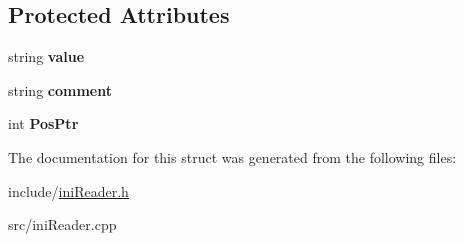 \subsection*{\-Protected \-Attributes}
\begin{DoxyCompactItemize}
\item 
\hypertarget{structKeyRecord_a81186e6db91374fc07fffb11b696ae7f}{string {\bfseries value}}\label{dc/dfa/structKeyRecord_a81186e6db91374fc07fffb11b696ae7f}

\item 
\hypertarget{structKeyRecord_aaa62600eaa986e1bb53f98e4aeebbfb9}{string {\bfseries comment}}\label{dc/dfa/structKeyRecord_aaa62600eaa986e1bb53f98e4aeebbfb9}

\item 
\hypertarget{structKeyRecord_af845a4d162b333f94cd8c81a067a65bb}{int {\bfseries \-Pos\-Ptr}}\label{dc/dfa/structKeyRecord_af845a4d162b333f94cd8c81a067a65bb}

\end{DoxyCompactItemize}


\-The documentation for this struct was generated from the following files\-:\begin{DoxyCompactItemize}
\item 
include/\hyperlink{iniReader_8h}{ini\-Reader.\-h}\item 
src/ini\-Reader.\-cpp\end{DoxyCompactItemize}
